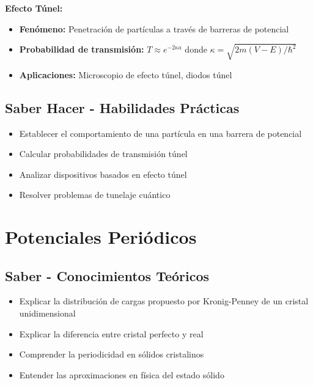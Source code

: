 \documentclass[12pt,a4paper,twoside]{book}
\begin{document}
	\begin{experimentobox}
		\textbf{Efecto Túnel:}
		\begin{itemize}
			\item \textbf{Fenómeno:} Penetración de partículas a través de barreras de potencial
			\item \textbf{Probabilidad de transmisión:} $T \approx e^{-2\kappa a}$ donde $\kappa = \sqrt{2m(V-E)/\hbar^2}$
			\item \textbf{Aplicaciones:} Microscopio de efecto túnel, diodos túnel
		\end{itemize}
	\end{experimentobox}
	
	\subsection{Saber Hacer - Habilidades Prácticas}
	\begin{hacerbox}
		\begin{itemize}
			\item Establecer el comportamiento de una partícula en una barrera de potencial
			\item Calcular probabilidades de transmisión túnel
			\item Analizar dispositivos basados en efecto túnel
			\item Resolver problemas de tunelaje cuántico
		\end{itemize}
	\end{hacerbox}
	
	\section{Potenciales Periódicos}
	\label{sec:potenciales_periodicos}
	
	\subsection{Saber - Conocimientos Teóricos}
	\begin{saberbox}
		\begin{itemize}
			\item Explicar la distribución de cargas propuesto por Kronig-Penney de un cristal unidimensional
			\item Explicar la diferencia entre cristal perfecto y real
			\item Comprender la periodicidad en sólidos cristalinos
			\item Entender las aproximaciones en física del estado sólido
		\end{itemize}
	\end{saberbox}
	
\end{document}
